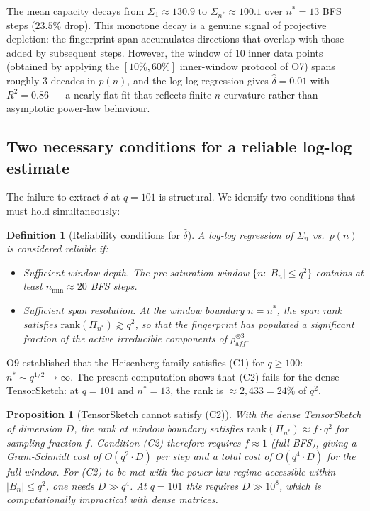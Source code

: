 \documentclass[11pt,a4paper]{article}
\newtheorem{proposition}[theorem]{Proposition}
\newtheorem{definition}[theorem]{Definition}
\newcommand{\delt}{\hat{\delta}}
\begin{document}
  The mean capacity decays from $\bar\Sigma_1 \approx 130.9$ to
  $\bar\Sigma_{n^*} \approx 100.1$ over $n^* = 13$ BFS steps ($23.5\%$ drop).
  This monotone decay is a genuine signal of projective depletion: the
  fingerprint span accumulates directions that overlap with those added
  by subsequent steps.
  However, the window of 10 inner data points (obtained by applying the
  $[10\%, 60\%]$ inner-window protocol of O7) spans roughly 3 decades
  in $p(n)$, and the log-log regression gives $\delt = 0.01$ with
  $R^2 = 0.86$ --- a nearly flat fit that reflects finite-$n$ curvature
  rather than asymptotic power-law behaviour.

  \subsection{Two necessary conditions for a reliable log-log estimate}
    \label{sec:two_regimes}

    The failure to extract $\delta$ at $q = 101$ is structural.
    We identify two conditions that must hold simultaneously:

    \begin{definition}[Reliability conditions for $\delt$]\label{def:C1C2}
      A log-log regression of $\bar\Sigma_n$ vs.\ $p(n)$ is considered
      \emph{reliable} if:
      \begin{itemize}
        \item[\textbf{(C1)}] \emph{Sufficient window depth.}
        The pre-saturation window $\{n : |B_n| \leq q^2\}$ contains
        at least $n_{\min} \approx 20$ BFS steps.
        \item[\textbf{(C2)}] \emph{Sufficient span resolution.}
        At the window boundary $n = n^*$, the span rank satisfies
        $\mathrm{rank}(\Pi_{n^*}) \gtrsim q^2$, so that the fingerprint
        has populated a significant fraction of the active irreducible
        components of $\rho_{\mathrm aff}^{\otimes 3}$.
      \end{itemize}
    \end{definition}

    O9 established that the Heisenberg family satisfies (C1) for $q \geq 100$:
    $n^* \sim q^{1/2} \to \infty$.
    The present computation shows that (C2) fails for the dense TensorSketch:
    at $q = 101$ and $n^* = 13$, the rank is $\approx 2{,}433 = 24\%$ of $q^2$.

    \begin{proposition}[TensorSketch cannot satisfy (C2)]\label{prop:C2fail}
      With the dense TensorSketch of dimension $D$, the rank at window boundary
      satisfies $\mathrm{rank}(\Pi_{n^*}) \approx f \cdot q^2$ for sampling
      fraction $f$.
      Condition (C2) therefore requires $f \approx 1$ (full BFS), giving a
      Gram-Schmidt cost of $O(q^2 \cdot D)$ per step and a total cost of
      $O(q^4 \cdot D)$ for the full window.
      For (C2) to be met with the power-law regime accessible within
      $|B_n| \leq q^2$, one needs $D \gg q^4$.
      At $q = 101$ this requires $D \gg 10^8$, which is computationally
      impractical with dense matrices.
    \end{proposition}
\end{document}
